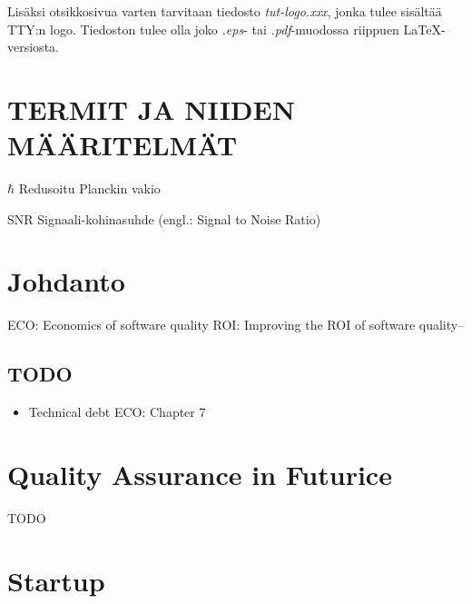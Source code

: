 ﻿\documentclass[12pt,a4paper,finnish]{tutthesis}
\begin{document}
Lisäksi otsikkosivua varten tarvitaan tiedosto \textit{tut-logo.xxx}, jonka
tulee sisältää TTY:n logo. Tiedoston tulee
olla joko \textit{.eps}- tai \textit{.pdf}-muodossa riippuen \LaTeX-versiosta.
 
\newpage
\tableofcontents
\newpage
\chapter*{TERMIT JA NIIDEN MÄÄRITELMÄT}
 
 
\begin{termiluettelo}
 
\item [$\hbar$] Redusoitu Planckin vakio
\item [SNR] Signaali-kohinasuhde (engl.: Signal to Noise Ratio)
 
\end{termiluettelo} 
 
 
\newpage
\renewcommand{\chaptermark}[1]{\markboth{\thechapter. \ #1}{}}
\renewcommand{\sectionmark}[1]{\markright{}{}}
\lhead{\fancyplain{}{\leftmark}}
 
 
\chapter{Johdanto}
 
 ECO: Economics of software quality
 ROI: Improving the ROI of software quality--
 
 \section{TODO}




 \begin{itemize}




 \item Technical debt ECO: Chapter 7
 
 \end{itemize} 
 
 \chapter{Quality Assurance in Futurice}
 
TODO

 \chapter{Startup}
 
\end{document}
